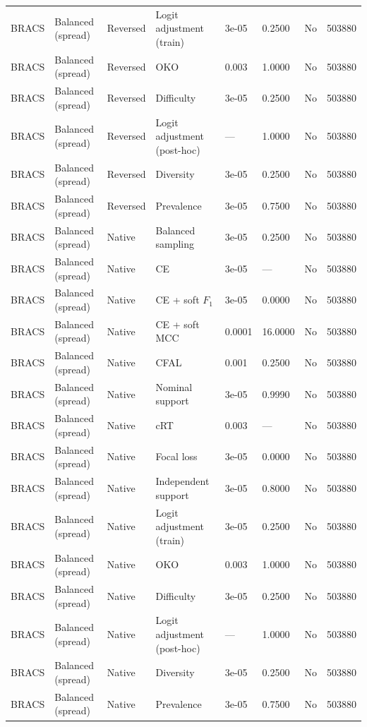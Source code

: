 \begin{longtable}{lllllllr}
BRACS & Balanced (spread) & Reversed & Logit adjustment (train) & 3e-05 & 0.2500 & No & 503880 \\
BRACS & Balanced (spread) & Reversed & OKO & 0.003 & 1.0000 & No & 503880 \\
BRACS & Balanced (spread) & Reversed & Difficulty & 3e-05 & 0.2500 & No & 503880 \\
BRACS & Balanced (spread) & Reversed & Logit adjustment (post-hoc) & --- & 1.0000 & No & 503880 \\
BRACS & Balanced (spread) & Reversed & Diversity & 3e-05 & 0.2500 & No & 503880 \\
BRACS & Balanced (spread) & Reversed & Prevalence & 3e-05 & 0.7500 & No & 503880 \\
BRACS & Balanced (spread) & Native & Balanced sampling & 3e-05 & 0.2500 & No & 503880 \\
BRACS & Balanced (spread) & Native & CE & 3e-05 & --- & No & 503880 \\
BRACS & Balanced (spread) & Native & CE + soft $F_1$ & 3e-05 & 0.0000 & No & 503880 \\
BRACS & Balanced (spread) & Native & CE + soft MCC & 0.0001 & 16.0000 & No & 503880 \\
BRACS & Balanced (spread) & Native & CFAL & 0.001 & 0.2500 & No & 503880 \\
BRACS & Balanced (spread) & Native & Nominal support & 3e-05 & 0.9990 & No & 503880 \\
BRACS & Balanced (spread) & Native & cRT & 0.003 & --- & No & 503880 \\
BRACS & Balanced (spread) & Native & Focal loss & 3e-05 & 0.0000 & No & 503880 \\
BRACS & Balanced (spread) & Native & Independent support & 3e-05 & 0.8000 & No & 503880 \\
BRACS & Balanced (spread) & Native & Logit adjustment (train) & 3e-05 & 0.2500 & No & 503880 \\
BRACS & Balanced (spread) & Native & OKO & 0.003 & 1.0000 & No & 503880 \\
BRACS & Balanced (spread) & Native & Difficulty & 3e-05 & 0.2500 & No & 503880 \\
BRACS & Balanced (spread) & Native & Logit adjustment (post-hoc) & --- & 1.0000 & No & 503880 \\
BRACS & Balanced (spread) & Native & Diversity & 3e-05 & 0.2500 & No & 503880 \\
BRACS & Balanced (spread) & Native & Prevalence & 3e-05 & 0.7500 & No & 503880 \\

\end{longtable}
